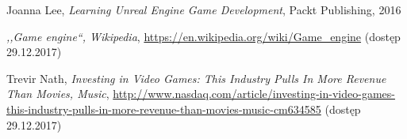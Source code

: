 \documentclass[multip]{SGGW-thesis}
\begin{document}
\begin{thebibliography}{9}

Joanna Lee, \textit{Learning Unreal Engine Game Development}, Packt Publishing, 2016

\textit{,,Game engine``, Wikipedia}, \url{https://en.wikipedia.org/wiki/Game_engine} {\mbox(dostęp 29.12.2017)}

Trevir Nath, \textit{Investing in Video Games: This Industry Pulls In More Revenue Than Movies, Music},
\url{http://www.nasdaq.com/article/investing-in-video-games-this-industry-pulls-in-more-revenue-than-movies-music-cm634585} {\mbox(dostęp 29.12.2017)}

\end{thebibliography}

\beforelastpage
\end{document}
